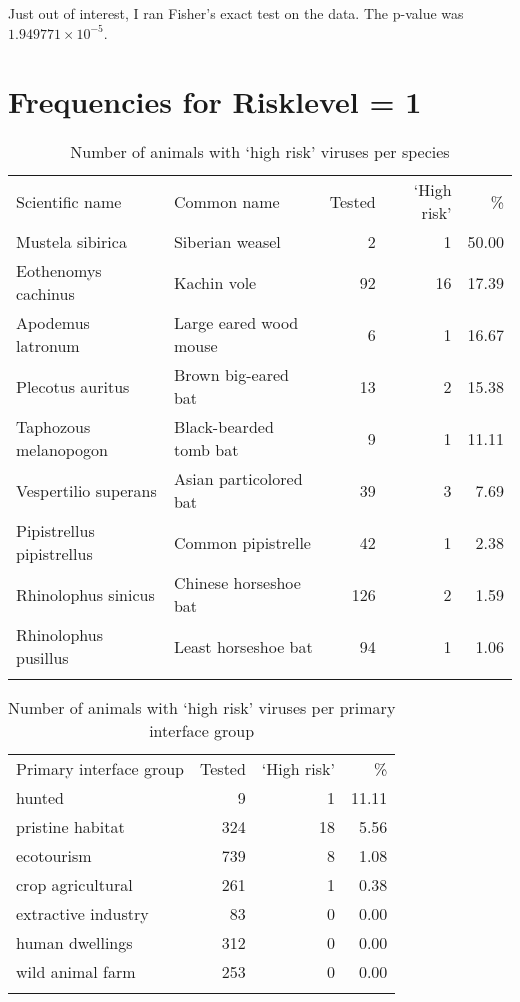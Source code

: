 \documentclass[11pt,article,oneside]{article}
\begin{document}
Just out of interest, I ran Fisher's exact test on the data. The p-value
was $1.949771\times 10^{-5}$.

\section{Frequencies for Risklevel =
1}\label{frequencies-for-risklevel-1}

\begin{longtable}[c]{@{}llrrr@{}}
\toprule\addlinespace
Scientific name & Common name & Tested & `High risk' & \%
\\\addlinespace
\midrule\endhead
Mustela sibirica & Siberian weasel & 2 & 1 & 50.00
\\\addlinespace
Eothenomys cachinus & Kachin vole & 92 & 16 & 17.39
\\\addlinespace
Apodemus latronum & Large eared wood mouse & 6 & 1 & 16.67
\\\addlinespace
Plecotus auritus & Brown big-eared bat & 13 & 2 & 15.38
\\\addlinespace
Taphozous melanopogon & Black-bearded tomb bat & 9 & 1 & 11.11
\\\addlinespace
Vespertilio superans & Asian particolored bat & 39 & 3 & 7.69
\\\addlinespace
Pipistrellus pipistrellus & Common pipistrelle & 42 & 1 & 2.38
\\\addlinespace
Rhinolophus sinicus & Chinese horseshoe bat & 126 & 2 & 1.59
\\\addlinespace
Rhinolophus pusillus & Least horseshoe bat & 94 & 1 & 1.06
\\\addlinespace
\bottomrule
\addlinespace
\caption{Number of animals with `high risk' viruses per species}
\end{longtable}

\begin{longtable}[c]{@{}lrrr@{}}
\toprule\addlinespace
Primary interface group & Tested & `High risk' & \%
\\\addlinespace
\midrule\endhead
hunted & 9 & 1 & 11.11
\\\addlinespace
pristine habitat & 324 & 18 & 5.56
\\\addlinespace
ecotourism & 739 & 8 & 1.08
\\\addlinespace
crop agricultural & 261 & 1 & 0.38
\\\addlinespace
extractive industry & 83 & 0 & 0.00
\\\addlinespace
human dwellings & 312 & 0 & 0.00
\\\addlinespace
wild animal farm & 253 & 0 & 0.00
\\\addlinespace
\bottomrule
\addlinespace
\caption{Number of animals with `high risk' viruses per primary
interface group}
\end{longtable}
\end{document}
